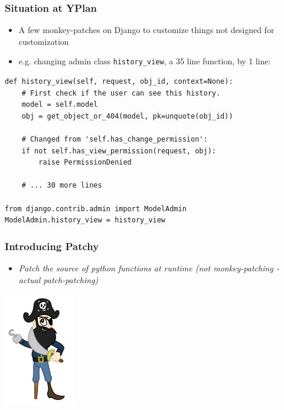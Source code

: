 \documentclass{beamer}
\begin{document}
\begin{frame}[fragile]\frametitle{Situation at YPlan}

    \begin{itemize}
        \item A few monkey-patches on Django to customize things not designed for customization
        \item e.g. changing admin class \texttt{history\_view}, a 35 line
              function, by 1 line:
    \end{itemize}

    \begin{lstlisting}
def history_view(self, request, obj_id, context=None):
    # First check if the user can see this history.
    model = self.model
    obj = get_object_or_404(model, pk=unquote(obj_id))

    # Changed from 'self.has_change_permission':
    if not self.has_view_permission(request, obj):
        raise PermissionDenied

    # ... 30 more lines

from django.contrib.admin import ModelAdmin
ModelAdmin.history_view = history_view
\end{lstlisting}


\end{frame}


\begin{frame}[fragile]\frametitle{Introducing Patchy}

    \begin{itemize}
        \item \textit{Patch the source of python functions at runtime (not monkey-patching - actual patch-patching)}
    \end{itemize}

    \begin{center}
        \includegraphics[height=5cm]{patchy-pirate}
    \end{center}

\end{frame}
\end{document}
